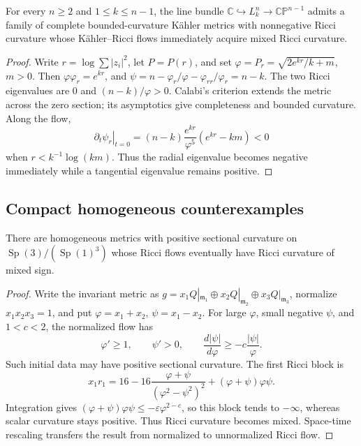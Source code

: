 \begin{theorem}
\label{thm:chow-ii-kahler-ricci-nonnegative-counterexample}

For every \(n\geq2\) and \(1\leq k\leq n-1\), the line bundle
\(\mathbb C\hookrightarrow L_k^n\to\mathbb{CP}^{n-1}\) admits a family of
complete bounded-curvature Kähler metrics with nonnegative Ricci curvature
whose Kähler--Ricci flows immediately acquire mixed Ricci curvature.
\end{theorem}
\begin{proof}
\sketch
Write \(r=\log\sum|z_i|^2\), let \(P=P(r)\), and set
\(\varphi=P_r=\sqrt{2e^{kr}/k+m}\), \(m>0\).  Then
\(\varphi\varphi_r=e^{kr}\), and
\(\psi=n-\varphi_r/\varphi-\varphi_{rr}/\varphi_r=n-k\).  The two Ricci
eigenvalues are \(0\) and \((n-k)/\varphi>0\).  Calabi's criterion extends
the metric across the zero section; its asymptotics give completeness and
bounded curvature.  Along the flow,
\[
 \left.\partial_t\psi_r\right|_{t=0}
 =(n-k)\frac{e^{kr}}{\varphi^5}(e^{kr}-km)<0
\]
when \(r<k^{-1}\log(km)\).  Thus the radial eigenvalue becomes negative
immediately while a tangential eigenvalue remains positive.
\end{proof}

\subsection{Compact homogeneous counterexamples}

\begin{theorem}
\label{thm:chow-ii-bohm-wilking-ricci-sign-counterexample}

There are homogeneous metrics with positive sectional curvature on
\(\operatorname{Sp}(3)/(\operatorname{Sp}(1)^3)\) whose Ricci flows
eventually have Ricci curvature of mixed sign.
\end{theorem}
\begin{proof}
\sketch
Write the invariant metric as \(g=x_1Q|_{\mathfrak m_1}\oplus
x_2Q|_{\mathfrak m_2}\oplus x_3Q|_{\mathfrak m_3}\), normalize
\(x_1x_2x_3=1\), and put \(\varphi=x_1+x_2\), \(\psi=x_1-x_2\).  For large
\(\varphi\), small negative \(\psi\), and \(1<c<2\), the normalized flow has
\[
 \varphi'\geq1,\qquad\psi'>0,\qquad
 \frac{d|\psi|}{d\varphi}\geq-c\frac{|\psi|}{\varphi}.
\]
Such initial data may have positive sectional curvature.  The first Ricci
block is
\[
 x_1r_1=16-16\frac{\varphi+\psi}{(\varphi^2-\psi^2)^2}
 +(\varphi+\psi)\varphi\psi.
\]
Integration gives
\((\varphi+\psi)\varphi\psi\leq-\varepsilon\varphi^{2-c}\), so this block
tends to \(-\infty\), whereas scalar curvature stays positive.  Thus Ricci
curvature becomes mixed.  Space-time rescaling transfers the result from
normalized to unnormalized Ricci flow.
\end{proof}

